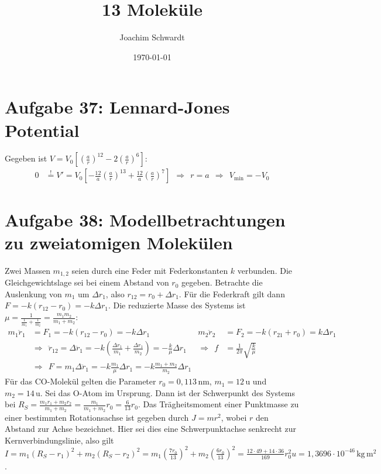 \documentclass[a4paper,12pt]{article}
\newcommand{\kla}{}
\newcommand{\klam}{}
\newcommand{\tecxt}{}
\begin{document}
\title{13 Moleküle}
\author{Joachim Schwardt}
\date{\today}
\maketitle

\section*{Aufgabe 37: Lennard-Jones Potential}
Gegeben ist $V=V_0\klam\left[ {\kla\left( {\frac{a}{r}} \right)^{12}-2\kla\left( {\frac{a}{r}} \right)^6} \right]$:
\begin{align*}
0&\overset{!}{=}V'=V_0\klam\left[ {-\frac{12}{a}\kla\left( {\frac{a}{r}} \right)^{13}+\frac{12}{a}\kla\left( {\frac{a}{r}} \right)^7} \right]\ \ \Rightarrow\ \ r=a\ \ \Rightarrow\ \ V_\tecxt\text{min}=-V_0
\end{align*}
\section*{Aufgabe 38: Modellbetrachtungen zu zweiatomigen Molekülen}
Zwei Massen $m_{1,2}$ seien durch eine Feder mit Federkonstanten $k$ verbunden. Die Gleichgewichtslage sei bei einem Abstand von $r_0$ gegeben. Betrachte die Auslenkung von $m_1$ um $\Delta r_1$, also $r_{12}=r_0+\Delta r_1$. Für die Federkraft gilt dann $F=-k(r_{12}-r_0)=-k\Delta r_1$. Die reduzierte Masse des Systems ist $\mu=\frac{1}{\frac{1}{m_1}+\frac{1}{m_2}}=\frac{m_1m_2}{m_1+m_2}$:
\begin{align*}
m_1\ddot{r}_1&=F_1=-k(r_{12}-r_0)=-k\Delta r_1&m_2\ddot{r}_2&=F_2=-k(r_{21}+r_0)=k\Delta r_1\\
&\Rightarrow\ \ \ddot{r}_{12}=\Delta\ddot{r}_1=-k\kla\left( {\frac{\Delta r_1}{m_1}+\frac{\Delta r_1}{m_2}} \right)=-\frac{k}{\mu}\Delta r_1&\Rightarrow\ \ f&=\frac{1}{2\pi}\sqrt{\frac{k}{\mu}}\\
&\Rightarrow\ \ F=m_1\Delta\ddot{r}_1=-k\frac{m_1}{\mu}\Delta r_1=-k\frac{m_1+m_2}{m_2}\Delta r_1
\end{align*}
Für das CO-Molekül gelten die Parameter $r_0=0,113\,$nm, $m_1=12\,$u und $m_2=14\,$u. Sei das O-Atom im Ursprung. Dann ist der Schwerpunkt des Systems bei $R_S=\frac{m_1r_1+m_2r_2}{m_1+m_2}=\frac{m_1}{m_1+m_2}r_0=\frac{6}{13}r_0$. Das Trägheitsmoment einer Punktmasse zu einer bestimmten Rotationsachse ist gegeben durch $J=mr^2$, wobei $r$ den Abstand zur Achse bezeichnet. Hier sei dies eine Schwerpunktachse senkrecht zur Kernverbindungslinie, also gilt $I=m_1(R_S-r_1)^2+m_2(R_S-r_2)^2=m_1\kla\left( {\frac{7r_0}{13}} \right)^2+m_2\kla\left( {\frac{6r_0}{13}} \right)^2=\frac{12\cdot 49+14\cdot 36}{169} r_0^2u=1,3696\cdot 10^{-46}\,\tecxt\text{kg}\,\tecxt\text{m}^2$.
\end{document}
